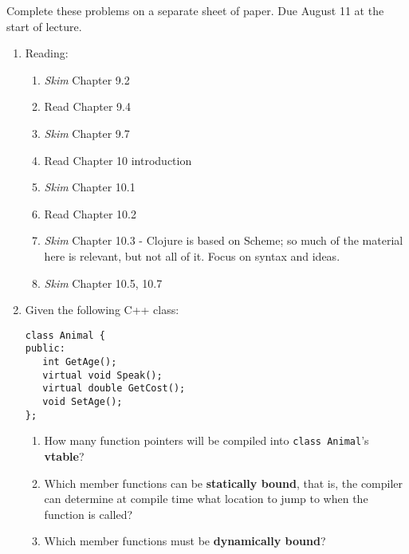 \documentclass[9pt]{article}
\begin{document}
\noindent Complete these problems on a separate sheet of paper. Due August 11 at
the start of lecture.
\begin{enumerate}
   \item Reading:

         \begin{enumerate}
            \item \textit{Skim} Chapter 9.2
            \item Read Chapter 9.4
            \item \textit{Skim} Chapter 9.7
            \item Read Chapter 10 introduction
            \item \textit{Skim} Chapter 10.1
            \item Read Chapter 10.2
            \item \textit{Skim} Chapter 10.3 - Clojure is based on Scheme; so
                  much of the material here is relevant, but not all of it.
                  Focus on syntax and ideas.
            \item \textit{Skim} Chapter 10.5, 10.7      
         \end{enumerate}
   \item Given the following C++ class:

         \verb|class Animal {| \\
         \verb|public:| \\
         \verb|   int GetAge();| \\
         \verb|   virtual void Speak();| \\
         \verb|   virtual double GetCost();| \\
         \verb|   void SetAge();| \\
         \verb|};|

         \begin{enumerate}
            \item How many function pointers will be compiled into
                  \verb|class Animal|'s \textbf{vtable}?
            \item Which member functions can be \textbf{statically bound}, that
                  is, the compiler can determine at compile time what location
                  to jump to when the function is called?
            \item Which member functions must be \textbf{dynamically bound}?
         \end{enumerate}


\end{enumerate}
\end{document}
